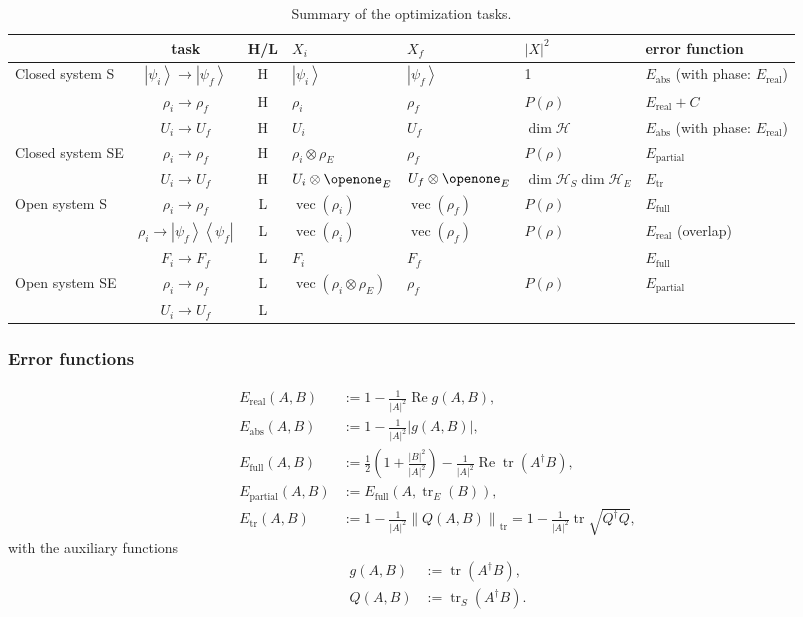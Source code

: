 \documentclass[aps, pra, a4paper, longbibliography]{revtex4}
\newcommand{\I}{\openone}
\newcommand{\ket}[1]{\left| #1 \right \rangle}
\newcommand{\ketbra}[2]{\left| #1 \right \rangle \left \langle #2 \right|}
\newcommand{\hilb}[1]{\mathcal{#1}}
\DeclareMathOperator{\tr}{tr}
\DeclareMathOperator{\re}{Re}
\DeclareMathOperator{\cvec}{vec}
\begin{document}
\begin{table}
\begin{tabular}{l|c|c|l|l|l|l}
& task & H/L & $X_i$ & $X_f$ & $|X|^2$ & error function\\
\hline
Closed system S
& $\ket{\psi_i} \to \ket{\psi_f}$ & H
& $\ket{\psi_i}$ & $\ket{\psi_f}$ & 1 & $E_\text{abs}$ (with phase: $E_\text{real}$)\\
& $\rho_i \to \rho_f$ & H
& $\rho_i$ & $\rho_f$ & $P(\rho)$ & $E_\text{real} + C$\\
& $U_i \to U_f$ & H
& $U_i$ & $U_f$ & $\dim \hilb{H}$ & $E_\text{abs}$ (with phase: $E_\text{real}$)\\
\hline
Closed system SE
& $\rho_i \to \rho_f$ & H
& $\rho_i \otimes \rho_E$ & $\rho_f$ & $P(\rho)$ & $E_\text{partial}$\\
& $U_i \to U_f$ & H
& $U_i \otimes \I_E$ & $U_f \otimes \I_E$ & $\dim \hilb{H}_S \dim \hilb{H}_E$ & $E_\text{tr}$\\
\hline
Open system S
& $\rho_i \to \rho_f$ & L & $\cvec(\rho_i)$ & $\cvec(\rho_f)$ & $P(\rho)$ & $E_\text{full}$\\
& $\rho_i \to \ketbra{\psi_f}{\psi_f}$ & L
& $\cvec(\rho_i)$ & $\cvec(\rho_f)$ & $P(\rho)$ & $E_\text{real}$ (overlap)\\
& $F_i \to F_f$ & L & $F_i$ & $F_f$ & & $E_\text{full}$\\
\hline
Open system SE
& $\rho_i \to \rho_f$ & L
& $\cvec(\rho_i \otimes \rho_E)$ & $\rho_f$ & $P(\rho)$ & $E_\text{partial}$\\
& $U_i \to U_f$ & L
\end{tabular}
\caption{Summary of the optimization tasks.}
\label{table:tasks}
\end{table}


\subsubsection*{Error functions}



\begin{align}
E_\text{real}(A, B) &:= 1 -\frac{1}{|A|^2} \re g(A, B),\\
E_\text{abs}(A, B) &:= 1 -\frac{1}{|A|^2} |g(A, B)|,\\
E_\text{full}(A, B) &:= \frac{1}{2}\left(1 +\frac{|B|^2}{|A|^2}\right) -\frac{1}{|A|^2} \re \tr(A^\dagger B),\\
E_\text{partial}(A, B) &:= E_\text{full}(A, \tr_E(B)),\\
E_\text{tr}(A, B) &:= 1 -\frac{1}{|A|^2} \left\|Q(A, B)\right\|_{\tr}
= 1 -\frac{1}{|A|^2} \tr \sqrt{Q^\dagger Q},
\end{align}
with the auxiliary functions
\begin{align}
g(A, B) &:= \tr(A^\dagger B),\\
Q(A, B) &:= \tr_S\left(A^\dagger B\right).
\end{align}
\end{document}
